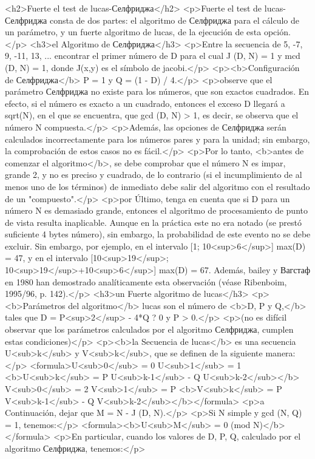 <h2>Fuerte el test de lucas-Селфриджа</h2>
<p>Fuerte el test de lucas-Селфриджа consta de dos partes: el algoritmo de Селфриджа para el cálculo de un parámetro, y un fuerte algoritmo de lucas, de la ejecución de esta opción.</p>
<h3>el Algoritmo de Селфриджа</h3>
<p>Entre la secuencia de 5, -7, 9, -11, 13, ... encontrar el primer número de D para el cual J (D, N) = 1 y mcd (D, N) = 1, donde J(x,y) es el símbolo de jacobi.</p>
<p><b>Configuración de Селфриджа</b> P = 1 y Q = (1 - D) / 4.</p>
<p>observe que el parámetro Селфриджа no existe para los números, que son exactos cuadrados. En efecto, si el número es exacto a un cuadrado, entonces el exceso D llegará a sqrt(N), en el que se encuentra, que gcd (D, N) > 1, es decir, se observa que el número N compuesta.</p>
<p>Además, las opciones de Селфриджа serán calculados incorrectamente para los números pares y para la unidad; sin embargo, la comprobación de estos casos no es fácil.</p>
<p>Por lo tanto, <b>antes de comenzar el algoritmo</b>, se debe comprobar que el número N es impar, grande 2, y no es preciso y cuadrado, de lo contrario (si el incumplimiento de al menos uno de los términos) de inmediato debe salir del algoritmo con el resultado de un "compuesto".</p>
<p>por Último, tenga en cuenta que si D para un número N es demasiado grande, entonces el algoritmo de procesamiento de punto de vista resulta inaplicable. Aunque en la práctica este no era notado (se prestó suficiente 4 bytes número), sin embargo, la probabilidad de este evento no se debe excluir. Sin embargo, por ejemplo, en el intervalo [1; 10<sup>6</sup>] max(D) = 47, y en el intervalo [10<sup>19</sup>; 10<sup>19</sup>+10<sup>6</sup>] max(D) = 67. Además, bailey y Вагстаф en 1980 han demostrado analíticamente esta observación (véase Ribenboim, 1995/96, p. 142).</p>
<h3>un Fuerte algoritmo de lucas</h3>
<p><b>Parámetros del algoritmo</b> lucas son el número de <b>D, P y Q,</b> tales que D = P<sup>2</sup> - 4*Q ? 0 y P > 0.</p>
<p>(no es difícil observar que los parámetros calculados por el algoritmo Селфриджа, cumplen estas condiciones)</p>
<p><b>la Secuencia de lucas</b> es una secuencia U<sub>k</sub> y V<sub>k</sub>, que se definen de la siguiente manera:</p>
<formula>U<sub>0</sub> = 0
U<sub>1</sub> = 1
<b>U<sub>k</sub> = P U<sub>k-1</sub> - Q U<sub>k-2</sub></b>
V<sub>0</sub> = 2
V<sub>1</sub> = P
<b>V<sub>k</sub> = P V<sub>k-1</sub> - Q V<sub>k-2</sub></b></formula>
<p>a Continuación, dejar que M = N - J (D, N).</p>
<p>Si N simple y gcd (N, Q) = 1, tenemos:</p>
<formula><b>U<sub>M</sub> = 0 (mod N)</b></formula>
<p>En particular, cuando los valores de D, P, Q, calculado por el algoritmo Селфриджа, tenemos:</p>
